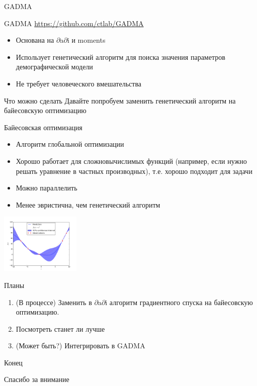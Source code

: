 \documentclass[presentation, smaller]{beamer}
\newcommand{\dadi}{$\partial$a$\partial$i\xspace }
\begin{document}
\begin{frame}[label={sec:org58aa193}]{GADMA}
\begin{block}{GADMA}
\url{https://github.com/ctlab/GADMA}
\begin{itemize}
\item Основана на \dadi и moments
\item Использует генетический алгоритм для поиска значения параметров
демографической модели
\item Не требует человеческого вмешательства
\end{itemize}
\end{block}
\end{frame}

\begin{frame}[label={sec:org2aac369}]{Что можно сделать}
Давайте попробуем заменить генетический алгоритм на байесовскую оптимизацию
\begin{block}{Байесовская оптимизация}
\begin{itemize}
\item Алгоритм глобальной оптимизации
\item Хорошо работает для сложновычислимых функций (например, если нужно решать
уравнение в частных производных), т.е. хорошо подходит для задачи
\item Можно параллелить
\item Менее эвристична, чем генетический алгоритм
\end{itemize}
\begin{center}
\includegraphics[width=1.5in]{./pics/bayes.png}
\end{center}
\end{block}
\end{frame}

\begin{frame}[label={sec:org96c606a}]{Планы}
\begin{enumerate}
\item (В процессе) Заменить в \dadi алгоритм градиентного спуска на байесовскую оптимизацию.
\item Посмотреть станет ли лучше
\item (Может быть?) Интегрировать в GADMA
\end{enumerate}
\end{frame}

\begin{frame}[label={sec:orgc114d27}]{Конец}
\begin{center}
Спасибо за внимание
\end{center}
\end{frame}
\end{document}

